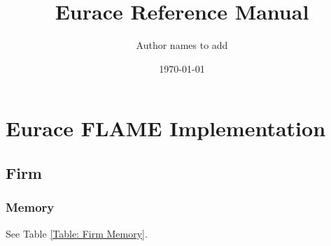 \documentclass[a4paper,11pt]{article}
\title{Eurace Reference Manual}
\author{Author names to add}
\date{\today}
\begin{document}
\maketitle
\tableofcontents
\clearpage

\section{Eurace FLAME Implementation}

\subsection{Firm}

\subsubsection{Memory}

See Table \ref{Table: Firm Memory}.
\end{document}
